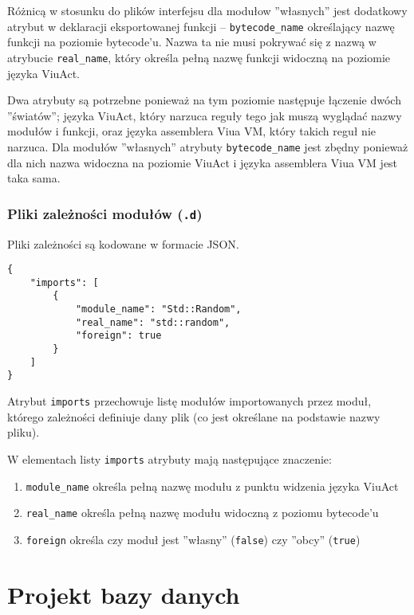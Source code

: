 Różnicą w stosunku do plików interfejsu dla modułow ''własnych'' jest dodatkowy atrybut w deklaracji
eksportowanej funkcji -- \texttt{bytecode\_name} określający nazwę funkcji na poziomie bytecode'u. Nazwa ta
nie musi pokrywać się z nazwą w atrybucie \texttt{real\_name}, który określa pełną nazwę funkcji widoczną na
poziomie języka ViuAct.

Dwa atrybuty są potrzebne ponieważ na tym poziomie następuje łączenie dwóch ''światów''; języka ViuAct, który
narzuca reguły tego jak muszą wyglądać nazwy modułów i funkcji, oraz języka assemblera Viua VM, który takich
reguł nie narzuca. Dla modułów ''własnych'' atrybuty \texttt{bytecode\_name} jest zbędny ponieważ dla nich
nazwa widoczna na poziomie ViuAct i języka assemblera Viua VM jest taka sama.

\subsubsection{Pliki zależności modułów (\texttt{.d})}
\label{pliki_zaleznosci_modulow}

Pliki zależności są kodowane w formacie JSON.

\begin{lstlisting}
{
    "imports": [
        {
            "module_name": "Std::Random",
            "real_name": "std::random",
            "foreign": true
        }
    ]
}
\end{lstlisting}

Atrybut \texttt{imports} przechowuje listę modułów importowanych przez moduł, którego zależności definiuje
dany plik (co jest określane na podstawie nazwy pliku).

W elementach listy \texttt{imports} atrybuty mają następujące znaczenie:

\begin{enumerate}
    \item \texttt{module\_name} określa pełną nazwę modułu z punktu widzenia języka ViuAct
    \item \texttt{real\_name} określa pełną nazwę modułu widoczną z poziomu bytecode'u
    \item \texttt{foreign} określa czy moduł jest ''własny'' (\texttt{false}) czy ''obcy'' (\texttt{true})
\end{enumerate}

\section{Projekt bazy danych}

